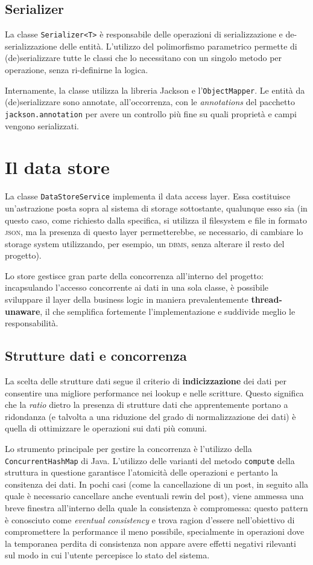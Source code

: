 \documentclass[a4paper,8pt]{article} %
\def\code#1{\texttt{#1}}
\begin{document}
\subsection{Serializer}
La classe \code{Serializer<T>} è responsabile delle operazioni di serializzazione e de-serializzazione delle entità.
L'utilizzo del polimorfismo parametrico permette di (de)serializzare tutte le classi che lo necessitano con un singolo metodo per operazione, senza ri-definirne
la logica.
\par Internamente, la classe utilizza la libreria Jackson e l'\code{ObjectMapper}. Le entità da (de)serializzare sono annotate, all'occorrenza, con le \emph{annotations} del pacchetto
\code{jackson.annotation} per avere un controllo più fine su quali proprietà e campi vengono serializzati.


\section{Il data store}
La classe \code{DataStoreService} implementa il data access layer. Essa costituisce un'astrazione posta sopra al sistema di storage sottostante, qualunque esso sia
(in questo caso, come richiesto dalla specifica, si utilizza il filesystem e file in formato \textsc{json}, ma la presenza di questo layer permetterebbe, se necessario, di cambiare lo storage system
utilizzando, per esempio, un \textsc{dbms}, senza alterare il resto del progetto).
\par Lo store gestisce gran parte della concorrenza all'interno del progetto: incapsulando l'accesso concorrente ai dati in una sola classe,
è possibile sviluppare il layer della business logic in maniera prevalentemente \textbf{thread-unaware}, il che semplifica fortemente l'implementazione e suddivide meglio le responsabilità.
\subsection{Strutture dati e concorrenza}
La scelta delle strutture dati segue il criterio di \textbf{indicizzazione} dei dati per consentire una migliore performance nei lookup e nelle scritture. Questo significa che la \emph{ratio} dietro
la presenza di strutture dati che apprentemente portano a ridondanza (e talvolta a una riduzione del grado di normalizzazione dei dati) è quella di ottimizzare le operazioni sui dati più comuni.
\par Lo strumento principale per gestire la concorrenza è l'utilizzo della \code{ConcurrentHashMap} di Java. L'utilizzo delle varianti del metodo \code{compute} della struttura in questione garantisce l'atomicità
delle operazioni e pertanto la consitenza dei dati. In pochi casi (come la cancellazione di un post, in seguito alla quale è necessario cancellare anche eventuali rewin del post), viene ammessa una breve finestra
all'interno della quale la consistenza è compromessa: questo pattern è conosciuto come \emph{eventual consistency} e trova ragion d'essere nell'obiettivo di compromettere la performance il meno possibile, specialmente
in operazioni dove la temporanea perdita di consistenza non appare avere effetti negativi rilevanti sul modo in cui l'utente percepisce lo stato del sistema.
\end{document}
